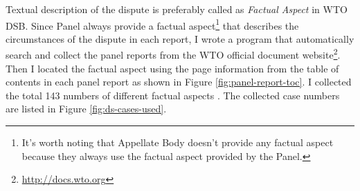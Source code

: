 Textual description of the dispute is preferably called as
\textit{Factual Aspect} in WTO DSB.
Since Panel
always provide a factual aspect\footnote{
  It's worth noting that Appellate Body doesn't provide any factual aspect because they always use the factual aspect provided by the Panel.
}
that describes the circumstances of the dispute
in each report, %
I wrote a program that
automatically search and collect
the panel reports from the WTO official document website\footnote{
  \url{http://docs.wto.org}
}.
Then I located the factual aspect using the page information from the
table of contents in each panel report as shown in Figure \ref{fig:panel-report-toc}.
I collected the total 143 numbers of different factual aspects . The collected case numbers are listed in Figure \ref{fig:ds-cases-used}.

